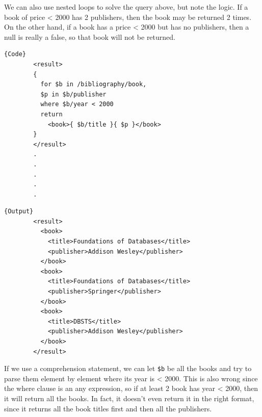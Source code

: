   \begin{example}
    \label{ex:nested-loops-and-list-comprehension}
    We can also use nested loops to solve the query above, but note the logic. If a book of price < 2000 has 2 publishers, then the book may be returned 2 times. On the other hand, if a book has a price < 2000 but has no publishers, then a null is really a false, so that book will not be returned. 

    \noindent\begin{minipage}{.5\textwidth}
      \begin{lstlisting}[]{Code}
        <result>
        {
          for $b in /bibliography/book,
          $p in $b/publisher
          where $b/year < 2000
          return 
            <book>{ $b/title }{ $p }</book>
        }
        </result> 
        .
        .
        .
        .
        .
      \end{lstlisting}
      \end{minipage}
      \hfill
      \begin{minipage}{.49\textwidth}
      \begin{lstlisting}[]{Output}
        <result>
          <book>
            <title>Foundations of Databases</title>
            <publisher>Addison Wesley</publisher>
          </book>
          <book>
            <title>Foundations of Databases</title>
            <publisher>Springer</publisher>
          </book>
          <book>
            <title>DBSTS</title>
            <publisher>Addison Wesley</publisher>
          </book>
        </result>          
      \end{lstlisting}
    \end{minipage}

    If we use a comprehension statement, we can let \texttt{\$b} be all the books and try to parse them element by element where its year is < 2000. This is also wrong since the where clause is an any expression, so if at least 2 book has year < 2000, then it will return all the books. In fact, it doesn't even return it in the right format, since it returns all the book titles first and then all the publishers. 


\end{example}
